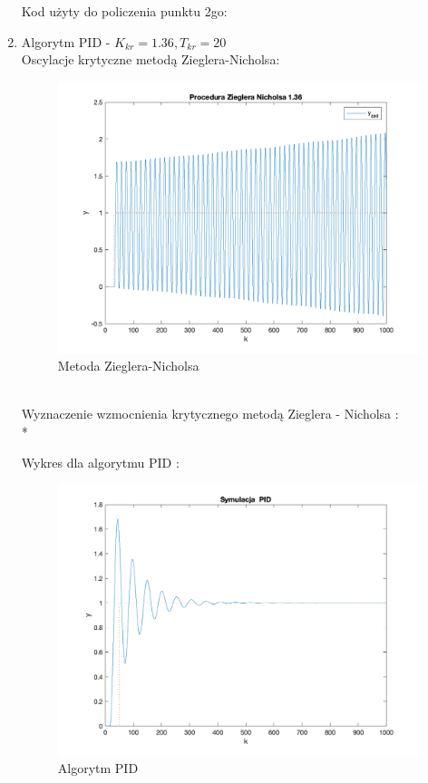 \documentclass[a4paper, 11pt]{article}
\begin{document}
\begin{enumerate}
\begin{table}[h]
\begin{tabular}{|l|l|l|l|l|l|}
\end{tabular}
\end{table} 
Kod użyty do policzenia punktu 2go:
  
\newpage
\item Algorytm PID - \(K_{kr} = 1.36 , T_{kr} = 20 \)\\
Oscylacje krytyczne metodą Zieglera-Nicholsa:
\begin{figure} [h]
\centering
 \includegraphics[width=\linewidth]{./ModelsP3/ZN/P2_K136png.png} 
\caption[Metoda Zieglera-Nicholsa]
{Metoda Zieglera-Nicholsa}
\end{figure}
\\
Wyznaczenie wzmocnienia krytycznego metodą Zieglera - Nicholsa : \\*
  
Wykres dla algorytmu PID : 
\begin{figure}[h]
\centering
 \includegraphics[width=\linewidth]{./ModelsP3/PID/P4-2_r1_47532r2_-86292r3_39168.png} 
\caption[Algorytm PID]
{Algorytm PID}
\end{figure}


\end{enumerate}
\end{document}
